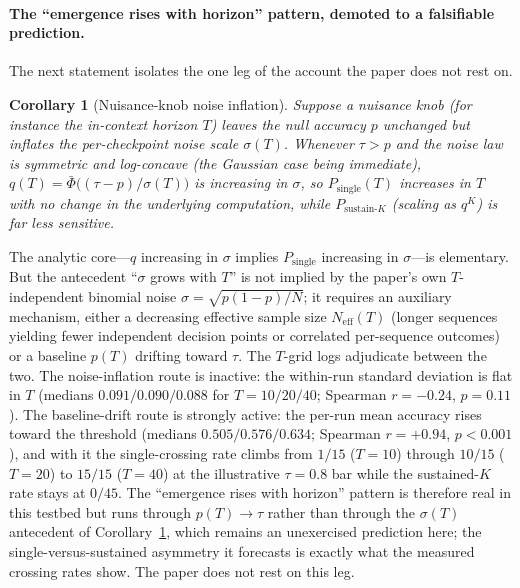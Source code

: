 \documentclass[11pt]{article}
\theoremstyle{plain}
\newtheorem{corollary}{Corollary}
\theoremstyle{definition}
\begin{document}
\paragraph{The ``emergence rises with horizon'' pattern, demoted to a falsifiable prediction.}
The next statement isolates the one leg of the account the paper does not rest on.

\begin{corollary}[Nuisance-knob noise inflation]\label{cor:tdep}
Suppose a nuisance knob (for instance the in-context horizon $T$) leaves the null accuracy
$p$ unchanged but inflates the per-checkpoint noise scale $\sigma(T)$. Whenever $\tau>p$ and
the noise law is symmetric and log-concave (the Gaussian case being immediate),
$q(T)=\bar\Phi\bigl((\tau-p)/\sigma(T)\bigr)$ is increasing in $\sigma$, so
$P_{\mathrm{single}}(T)$ increases in $T$ with no change in the underlying computation,
while $P_{\mathrm{sustain}\text{-}K}$ (scaling as $q^{K}$) is far less sensitive.
\end{corollary}

The analytic core---$q$ increasing in $\sigma$ implies $P_{\mathrm{single}}$ increasing in
$\sigma$---is elementary. But the antecedent ``$\sigma$ grows with $T$'' is not
implied by the paper's own $T$-independent binomial noise $\sigma=\sqrt{p(1-p)/N}$; it
requires an auxiliary mechanism, either a decreasing effective sample size
$N_{\mathrm{eff}}(T)$ (longer sequences yielding fewer independent decision points or
correlated per-sequence outcomes) or a baseline $p(T)$ drifting toward $\tau$. The $T$-grid
logs adjudicate between the two. The noise-inflation route is inactive: the within-run
standard deviation is flat in $T$ (medians $0.091/0.090/0.088$ for $T=10/20/40$; Spearman
$r=-0.24$, $p=0.11$). The baseline-drift route is strongly active: the per-run mean accuracy
rises toward the threshold (medians $0.505/0.576/0.634$; Spearman $r=+0.94$, $p<0.001$), and
with it the single-crossing rate climbs from $1/15$ ($T{=}10$) through $10/15$ ($T{=}20$) to
$15/15$ ($T{=}40$) at the illustrative $\tau=0.8$ bar while the sustained-$K$ rate stays at
$0/45$. The ``emergence rises with
horizon'' pattern is therefore real in this testbed but runs through $p(T)\to\tau$ rather
than through the $\sigma(T)$ antecedent of Corollary~\ref{cor:tdep}, which remains an
unexercised prediction here; the single-versus-sustained asymmetry it forecasts is exactly
what the measured crossing rates show. The paper does not rest on this leg.
\end{document}

